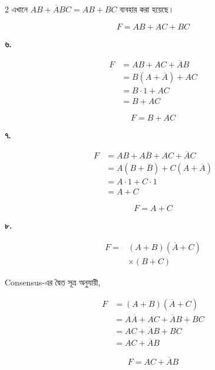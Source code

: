 \begin{multicols}{2}
{\footnotesize
এখানে \(AB+\overline ABC=AB+BC\) ব্যবহার করা হয়েছে।
}

\[
\boxed{F=AB+AC+BC}
\]

\medskip


\textbf{৬.}

\[
\begin{aligned}
F
&=AB+AC+\overline AB\\
&=B(A+\overline A)+AC\\
&=B\cdot1+AC\\
&=B+AC
\end{aligned}
\]

\[
\boxed{F=B+AC}
\]

\medskip


\textbf{৭.}

\[
\begin{aligned}
F
&=AB+A\overline B+AC+\overline AC\\
&=A(B+\overline B)
+C(A+\overline A)\\
&=A\cdot1+C\cdot1\\
&=A+C
\end{aligned}
\]

\[
\boxed{F=A+C}
\]

\medskip


\textbf{৮.}

\[
\begin{aligned}
F
={}&(A+B)(\overline A+C)\\
&\times(B+C)
\end{aligned}
\]

\textenglish{Consensus}-এর দ্বৈত সূত্র অনুযায়ী,

\[
\begin{aligned}
F
&=(A+B)(\overline A+C)\\
&=A\overline A+AC+\overline AB+BC\\
&=AC+\overline AB+BC\\
&=AC+\overline AB
\end{aligned}
\]

\[
\boxed{F=AC+\overline AB}
\]


\end{multicols}
